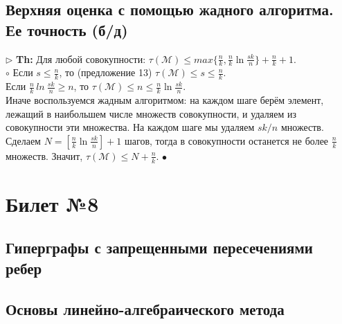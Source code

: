 \documentclass[a4paper]{article}
\begin{document}
\subsection{Верхняя оценка с помощью жадного алгоритма. Ее точность (б/д)}
$\triangleright$ \textbf{Th:}  Для любой совокупности: $\tau(\mathcal{M})\leq max\{\frac{n}{k},\frac{n}{k}\ln \frac{sk}{n}\}+\frac{n}{k}+1$.
\\
$\circ$  Если $s\leq \frac{n}{k}$, то (предложение 13) $\tau(\mathcal{M})\leq s\leq \frac{n}{k}$.\\
Если $\frac{n}{k}\,ln\:\frac{sk}{n}\geq n$, то $\tau(\mathcal{M})\leq n \leq \frac{n}{k}\ln \frac{sk}{n}$.\\
Иначе воспользуемся жадным алгоритмом: на каждом шаге берём элемент, лежащий в наибольшем числе множеств совокупности, и удаляем из совокупности эти множества. На каждом шаге мы удаляем $sk/n$ множеств. Сделаем $N = [\frac{n}{k}\ln \frac{sk}{n}]+1$ шагов, тогда в совокупности останется не более $\frac{n}{k}$ множеств. Значит, $\tau(\mathcal{M})\leq N+\frac{n}{k}$.
$\bullet$ \\ 

\section{Билет №8}
\subsection{Гиперграфы с запрещенными пересечениями ребер}
\subsection{Основы линейно-алгебраического метода}
\end{document}
